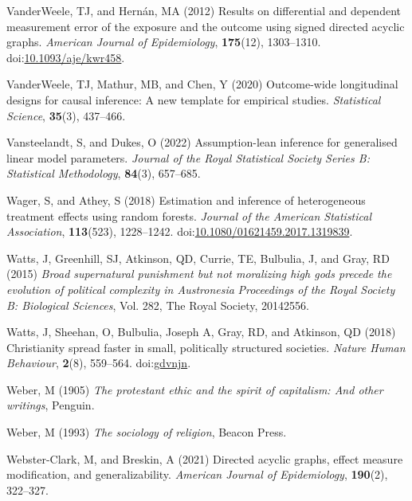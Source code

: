 \documentclass[
  single column]{article}
\newlength{\cslhangindent}
\newenvironment{CSLReferences}[2] %
 {\begin{list}{}{%
  \setlength{\itemindent}{0pt}
  \setlength{\leftmargin}{0pt}
  \setlength{\parsep}{0pt}
  \ifodd #1
   \setlength{\leftmargin}{\cslhangindent}
   \setlength{\itemindent}{-1\cslhangindent}
  \fi
  \setlength{\itemsep}{#2\baselineskip}}}
 {\end{list}}
\begin{document}
\begin{CSLReferences}{1}{0}
VanderWeele, TJ, and Hernán, MA (2012) Results on differential and
dependent measurement error of the exposure and the outcome using signed
directed acyclic graphs. \emph{American Journal of Epidemiology},
\textbf{175}(12), 1303--1310.
doi:\href{https://doi.org/10.1093/aje/kwr458}{10.1093/aje/kwr458}.

VanderWeele, TJ, Mathur, MB, and Chen, Y (2020) Outcome-wide
longitudinal designs for causal inference: A new template for empirical
studies. \emph{Statistical Science}, \textbf{35}(3), 437--466.

Vansteelandt, S, and Dukes, O (2022) Assumption-lean inference for
generalised linear model parameters. \emph{Journal of the Royal
Statistical Society Series B: Statistical Methodology}, \textbf{84}(3),
657--685.

Wager, S, and Athey, S (2018) Estimation and inference of heterogeneous
treatment effects using random forests. \emph{Journal of the American
Statistical Association}, \textbf{113}(523), 1228--1242.
doi:\href{https://doi.org/10.1080/01621459.2017.1319839}{10.1080/01621459.2017.1319839}.

Watts, J, Greenhill, SJ, Atkinson, QD, Currie, TE, Bulbulia, J, and
Gray, RD (2015) \emph{Broad supernatural punishment but not moralizing
high gods precede the evolution of political complexity in
{A}ustronesia} \emph{Proceedings of the Royal Society B: Biological
Sciences}, Vol. 282, The Royal Society, 20142556.

Watts, J, Sheehan, O, Bulbulia, Joseph A, Gray, RD, and Atkinson, QD
(2018) Christianity spread faster in small, politically structured
societies. \emph{Nature Human Behaviour}, \textbf{2}(8), 559--564.
doi:\href{https://doi.org/gdvnjn}{gdvnjn}.

Weber, M (1905) \emph{The protestant ethic and the spirit of capitalism:
And other writings}, Penguin.

Weber, M (1993) \emph{The sociology of religion}, Beacon Press.

Webster-Clark, M, and Breskin, A (2021) Directed acyclic graphs, effect
measure modification, and generalizability. \emph{American Journal of
Epidemiology}, \textbf{190}(2), 322--327.


\end{CSLReferences}
\end{document}
